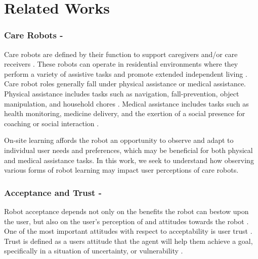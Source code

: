 \documentclass[letterpaper]{article} %
\begin{document}
\section{Related Works}
\label{sec:relatedworks}

\subsubsection{Care Robots -}
Care robots are defined by their function to support caregivers and/or care receivers \cite{van_wynsberghe_designing_2013}. These robots can operate in residential environments where they perform a variety of assistive tasks and promote extended independent living \cite{johnson_socially_2014,sabanovic_robot_2015, fiorini_assistive_2021, lee_reframing_2018}. Care robot roles generally fall under physical assistance or medical assistance. Physical assistance includes tasks such as navigation, fall-prevention, object manipulation, and household chores \cite{moxi, fischinger_hobbit_2016, swisslog_healthcare_autonomous_nodate, kittmann_let_2015, kostavelis_ramcip_2016, miseikis_lio-personal_2020}. Medical assistance includes tasks such as health monitoring, medicine delivery, and the exertion of a social presence for coaching or social interaction \cite{vitanza_assistive_2019, coradeschi_giraffplus_2013, umbrico_holistic_2020, nao, pepper, martinez-martin_pharos_2019}.

On-site learning affords the robot an opportunity to observe and adapt to individual user needs and preferences, which may be beneficial for both physical and medical assistance tasks. In this work, we seek to understand how observing various forms of robot learning may impact user perceptions of care robots. 

\subsubsection{Acceptance and Trust -}
Robot acceptance depends not only on the benefits the robot can bestow upon the user, but also on the user's perception of and attitudes towards the robot \cite{cesta_psychological_2007}. One of the most important attitudes with respect to acceptability is user trust \cite{yagoda_you_2012, langer_trust_2019}. Trust is defined as a users attitude that the agent will help them achieve a goal, specifically in a situation of uncertainty, or vulnerability \cite{kohn_measurement_2021, ullman_what_2018}. 
\end{document}
